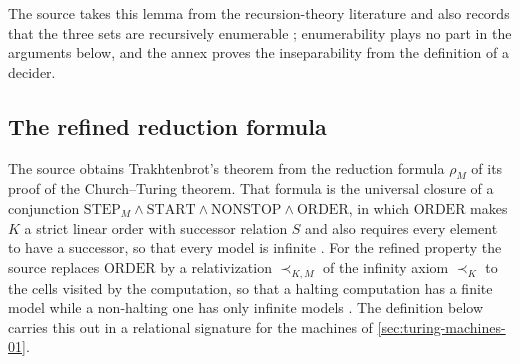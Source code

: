 The source takes this lemma from the recursion-theory literature and also
records that the three sets are recursively enumerable
\cite[Sect.~2.1.2, p.~34]{BorgerGradelGurevich1997}; enumerability plays no
part in the arguments below, and the annex proves the inseparability from the
definition of a decider.

\subsection{The refined reduction formula}
\label{sec:p02-w02-p02-036-refined}

The source obtains Trakhtenbrot's theorem from the reduction formula \(\rho_M\)
of its proof of the Church--Turing theorem.  That formula is the universal
closure of a conjunction \(\mathrm{STEP}_M\land\mathrm{START}\land
\mathrm{NONSTOP}\land\mathrm{ORDER}\), in which \(\mathrm{ORDER}\) makes \(K\)
a strict linear order with successor relation \(S\) and also requires every
element to have a successor, so that every model is infinite
\cite[Sect.~2.1.1, pp.~20--22]{BorgerGradelGurevich1997}.  For the refined
property the source replaces \(\mathrm{ORDER}\) by a relativization
\(\prec_{K,M}\) of the infinity axiom \(\prec_K\) to the cells visited by the
computation, so that a halting computation has a finite model while a
non-halting one has only infinite models
\cite[Sect.~2.1.2, pp.~34--35]{BorgerGradelGurevich1997}.  The definition below
carries this out in a relational signature for the machines of
\cref{sec:turing-machines-01}.

